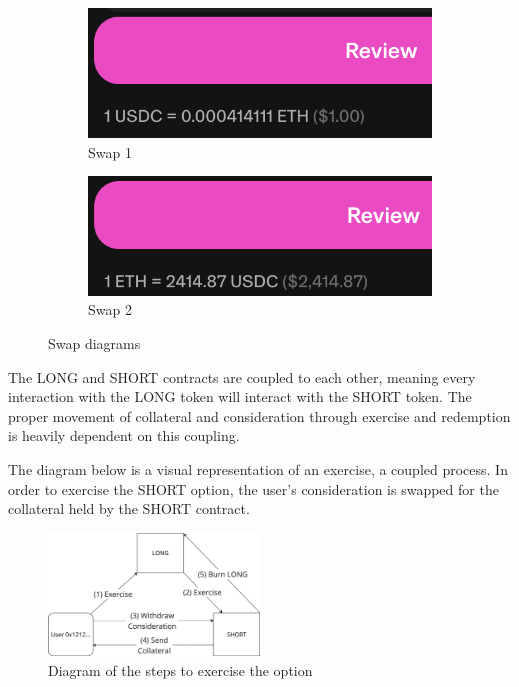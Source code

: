 \begin{figure}[h]
  \centering
  \begin{subfigure}[b]{0.45\textwidth}
    \includegraphics[width=\textwidth]{swap1.png}
    \caption{Swap 1}
    \label{fig:swap1}
  \end{subfigure}
  \hfill
  \begin{subfigure}[b]{0.45\textwidth}
    \includegraphics[width=\textwidth]{swap2.png}
    \caption{Swap 2}
    \label{fig:swap2}
  \end{subfigure}
  \caption{Swap diagrams}
  \label{fig:swaps}
\end{figure}


The LONG and SHORT contracts are coupled to each other, meaning every interaction with the LONG token will interact with the SHORT token.
The proper movement of collateral and consideration through exercise and redemption is heavily dependent on this coupling.

The diagram below is a visual representation of an exercise, a coupled process. 
In order to exercise the SHORT option, the user's consideration is swapped for the collateral held by the SHORT contract.
\begin{figure}[h]
  \centering
  \includegraphics[width=0.5\textwidth]{exercise.png}
  \caption{Diagram of the steps to exercise the option}
  \label{fig:exercise}
\end{figure}

